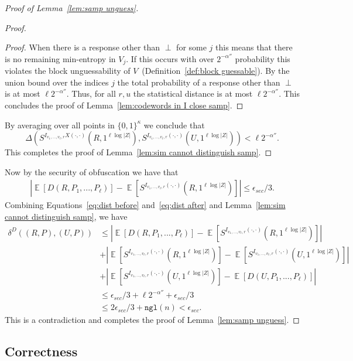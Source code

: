 \documentclass[11pt]{article}
\newcommand{\defref}[1]{\mbox{Definition~\ref{#1}}}
\newcommand{\lemref}[1]{\mbox{Lemma~\ref{#1}}}
\DeclareMathOperator*{\expe}{\mathbb{E}}
\newcommand{\zo}{\ensuremath{\{0, 1\}}}
\newcommand{\ngl}{\ensuremath{\mathtt{ngl}}\xspace}
\begin{document}
\begin{proof}[{\large Proof of \lemref{lem:samp unguess}}]
\begin{proof}
\begin{proof}
 When there is a response other than $\perp$ for some $j$ this means that there is no remaining min-entropy in $V_j$.  If this occurs with over $2^{-\alpha''}$ probability this violates the block unguessability of $V$~(\defref{def:block guessable}).  By the union bound over the indices $j$ the total probability of a response other than $\perp$ is at most $\ell 2^{-\alpha''}$. Thus, for all $r, u$ the statistical distance is at most $\ell 2^{-\alpha''}$.  This concludes the proof of \lemref{lem:codewords in I close samp}.
\end{proof}
By averaging over all points in $\zo^\kappa$ we conclude that 
\[\Delta(S^{I_{v_1, ..., v_\ell, r}X(\cdot, \cdot)}(R, 1^{\ell \log |Z|}), S^{I_{v_1, ..., v_\ell, r}(\cdot, \cdot)}(U, 1^{\ell \log |Z|})) < \ell 2^{-\alpha''}.\]  This completes the proof of \lemref{lem:sim cannot distinguish samp}.
\end{proof}

\noindent Now by the security of obfuscation we have that
\begin{align}
\label{eq:dist after}
|\expe [D(R, P_1,..., P_\ell) ]- \expe [S^{I_{v_1, ..., v_\ell, r}(\cdot, \cdot)}(R, 1^{\ell \log |Z|})] |\leq \epsilon_{sec}/3.
\end{align}
Combining Equations~\ref{eq:dist before} and~\ref{eq:dist after} and \lemref{lem:sim cannot distinguish samp}, we have
\begin{align*}
\delta^{D}((R, P), (U, P))&\leq |\expe [D(R, P_1,..., P_\ell)] - \expe [S^{I_{v_1, ..., v_\ell, r}(\cdot, \cdot)}(R, 1^{\ell \log |Z|})]| \\
&+|\expe[S^{I_{v_1, ..., v_\ell, r}(\cdot, \cdot)}(R, 1^{\ell \log |Z|})] - \expe[S^{I_{v_1, ..., v_\ell, r}(\cdot, \cdot)}(U, 1^{\ell \log |Z|})] |\\
&+|\expe [S^{I_{v_1, ..., v_\ell, r}(\cdot, \cdot)}(U, 1^{\ell \log |Z|})] - \expe [D(U, P_1,..., P_\ell) ]|\\
&\leq \epsilon_{sec}/3+ \ell 2^{-\alpha''}+\epsilon_{sec}/3 \\
&\leq 2\epsilon_{sec}/3 + \ngl(n) < \epsilon_{sec}.
\end{align*}
This is a contradiction and completes the proof of \lemref{lem:samp unguess}.
\end{proof}

\subsection{Correctness}
\label{sec:sampling errors}
\end{document}
